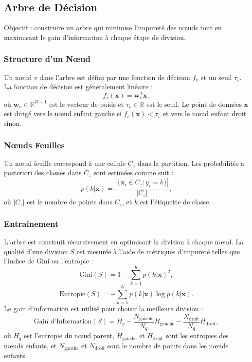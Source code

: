 \documentclass[a4paper,portrait]{article}
\begin{document}
\begin{multicols}{2}
\subsection{Arbre de Décision}

Objectif : construire un arbre qui minimise l'impureté des nœuds tout en maximisant le gain d'information à chaque étape de division.

\subsubsection{Structure d'un Nœud}
Un nœud \( v \) dans l'arbre est défini par une fonction de décision \( f_v \) et un seuil \( \tau_v \). La fonction de décision est généralement linéaire :
\[
f_v(\mathbf{x}) = \mathbf{w}_v^T \mathbf{x},
\]
où \( \mathbf{w}_v \in \mathbb{R}^{D+1} \) est le vecteur de poids et \( \tau_v \in \mathbb{R} \) est le seuil. Le point de données \( \mathbf{x} \) est dirigé vers le nœud enfant gauche si \( f_v(\mathbf{x}) < \tau_v \) et vers le nœud enfant droit sinon.

\subsubsection{Nœuds Feuilles}
Un nœud feuille correspond à une cellule \( C_z \) dans la partition. Les probabilités a posteriori des classes dans \( C_z \) sont estimées comme suit :
\[
p(k | \mathbf{x}) = \frac{|\{\mathbf{x}_i \in C_z : y_i = k\}|}{|C_z|},
\]
où \( |C_z| \) est le nombre de points dans \( C_z \), et \( k \) est l'étiquette de classe.

\subsubsection{Entraînement}
L'arbre est construit récursivement en optimisant la division à chaque nœud. La qualité d'une division \( S \) est mesurée à l'aide de métriques d'impureté telles que l'indice de Gini ou l'entropie :
\[
\text{Gini}(S) = 1 - \sum_{k=1}^K p(k | \mathbf{x})^2,
\]
\[
\text{Entropie}(S) = -\sum_{k=1}^K p(k | \mathbf{x}) \log p(k | \mathbf{x}).
\]
Le gain d'information est utilisé pour choisir la meilleure division :
\[
\text{Gain d'Information}(S) = H_{q} - \frac{N_{\text{gauche}}}{N_{q}}H_{\text{gauche}} - \frac{N_{\text{droit}}}{N_{q}}H_{\text{droit}},
\]
où \( H_{q} \) est l'entropie du nœud parent, \( H_{\text{gauche}} \) et \( H_{\text{droit}} \) sont les entropies des nœuds enfants, et \( N_{\text{gauche}} \) et \( N_{\text{droit}} \) sont le nombre de points dans les nœuds enfants.


\end{multicols}
\end{document}
